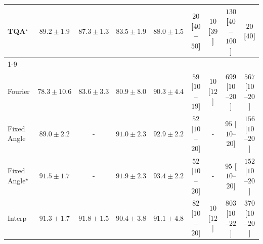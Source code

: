 \begin{tabular}{l|cccc|cccc|}
TQA$^\star$ & {\cellcolor[HTML]{0C723B}} \color[HTML]{F1F1F1} $89.2\pm 1.9$ & {\cellcolor[HTML]{228343}} \color[HTML]{F1F1F1} $87.3\pm 1.3$ & {\cellcolor[HTML]{4EB163}} \color[HTML]{F1F1F1} $83.5\pm 1.9$ & {\cellcolor[HTML]{1A7D40}} \color[HTML]{F1F1F1} $88.0\pm 1.5$ & {\cellcolor[HTML]{FFF5F1}} \color[HTML]{000000} $20$ [$40$--$50$] & {\cellcolor[HTML]{FFF7F3}} \color[HTML]{000000} $10$ [$39$] & {\cellcolor[HTML]{FDDBD7}} \color[HTML]{000000} $130$ [$40$--$100$] & {\cellcolor[HTML]{FFF5F1}} \color[HTML]{000000} $20$ [$40$] \\
\cline{1-9}
\multicolumn{9}{c}{\rule{0pt}{8pt}SV} \\
\midrule
Fourier & {\cellcolor[HTML]{A2BCDA}} \color[HTML]{000000} $78.3\pm 10.6$ & {\cellcolor[HTML]{4295C3}} \color[HTML]{F1F1F1} $83.6\pm 3.3$ & {\cellcolor[HTML]{78ABD0}} \color[HTML]{F1F1F1} $80.9\pm 8.0$ & {\cellcolor[HTML]{045A8D}} \color[HTML]{F1F1F1} $90.3\pm 4.4$ & {\cellcolor[HTML]{FEECE9}} \color[HTML]{000000} $59$ [$10$--$19$] & {\cellcolor[HTML]{FFF7F3}} \color[HTML]{000000} $10$ [$12$] & {\cellcolor[HTML]{7C0177}} \color[HTML]{F1F1F1} $699$ [$10$--$20$] & {\cellcolor[HTML]{C01588}} \color[HTML]{F1F1F1} $567$ [$10$--$20$] \\
Fixed Angle & {\cellcolor[HTML]{04639B}} \color[HTML]{F1F1F1} $89.0\pm 2.2$ & {\cellcolor[HTML]{000000}} \color[HTML]{F1F1F1} {\cellcolor{white}} \color{black} - & {\cellcolor[HTML]{045382}} \color[HTML]{F1F1F1} $91.0\pm 2.3$ & {\cellcolor[HTML]{023D60}} \color[HTML]{F1F1F1} $92.9\pm 2.2$ & {\cellcolor[HTML]{FEEEEA}} \color[HTML]{000000} $52$ [$10$--$20$] & {\cellcolor[HTML]{000000}} \color[HTML]{F1F1F1} {\cellcolor{white}} \color{black} - & {\cellcolor[HTML]{FDE4E0}} \color[HTML]{000000} $95$ [$10$--$20$] & {\cellcolor[HTML]{FDD3CF}} \color[HTML]{000000} $156$ [$10$--$20$] \\
Fixed Angle$^\star$ & {\cellcolor[HTML]{034C78}} \color[HTML]{F1F1F1} $91.5\pm 1.7$ & {\cellcolor[HTML]{000000}} \color[HTML]{F1F1F1} {\cellcolor{white}} \color{black} - & {\cellcolor[HTML]{034871}} \color[HTML]{F1F1F1} $91.9\pm 2.3$ & {\cellcolor[HTML]{023858}} \color[HTML]{F1F1F1} $93.4\pm 2.2$ & {\cellcolor[HTML]{FEEEEA}} \color[HTML]{000000} $52$ [$10$--$20$] & {\cellcolor[HTML]{000000}} \color[HTML]{F1F1F1} {\cellcolor{white}} \color{black} - & {\cellcolor[HTML]{FDE4E0}} \color[HTML]{000000} $95$ [$10$--$20$] & {\cellcolor[HTML]{FDD5D1}} \color[HTML]{000000} $152$ [$10$--$20$] \\
Interp & {\cellcolor[HTML]{034E7B}} \color[HTML]{F1F1F1} $91.3\pm 1.7$ & {\cellcolor[HTML]{034973}} \color[HTML]{F1F1F1} $91.8\pm 1.5$ & {\cellcolor[HTML]{04598C}} \color[HTML]{F1F1F1} $90.4\pm 3.8$ & {\cellcolor[HTML]{045280}} \color[HTML]{F1F1F1} $91.1\pm 4.8$ & {\cellcolor[HTML]{FEE6E3}} \color[HTML]{000000} $82$ [$10$--$20$] & {\cellcolor[HTML]{FFF7F3}} \color[HTML]{000000} $10$ [$12$] & {\cellcolor[HTML]{49006A}} \color[HTML]{F1F1F1} $803$ [$10$--$22$] & {\cellcolor[HTML]{F87CA8}} \color[HTML]{F1F1F1} $370$ [$10$--$20$] \\

\end{tabular}

